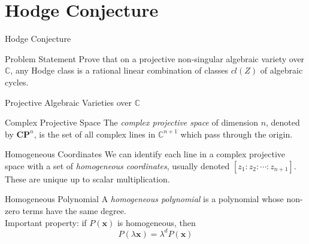 \documentclass{beamer}
\newcommand{\Complex}{\mathbb{C}}
\newcommand{\CP}{\mathbf{CP}}
\renewcommand{\vec}[1]{\mathbf{#1}}
\begin{document}
  \section{Hodge Conjecture}
  \begin{frame}{Hodge Conjecture}
      \begin{block}{Problem Statement}
          Prove that on a projective non-singular algebraic variety over
          $\Complex$, any Hodge class is a rational linear combination of
          classes $cl(Z)$ of algebraic cycles.
      \end{block}
  \end{frame}
  \begin{frame}{Projective Algebraic Varieties over $\Complex$}
      \pause
      \begin{block}{Complex Projective Space}
          The \textit{complex projective space} of dimension $n$, denoted by
          $\CP^n$, is the set of all \alert{complex} lines in $\Complex^{n+1}$
          which pass through the origin.
      \end{block}
      \pause
      \begin{block}{Homogeneous Coordinates}
          We can identify each line in a complex projective space with a set of
          \textit{homogeneous coordinates}, usually denoted $[z_1 : z_2 :
          \cdots : z_{n+1}]$. These are unique up to scalar multiplication.
      \end{block}
      \pause
      \begin{block}{Homogeneous Polynomial}
          A \textit{homogeneous polynomial} is a polynomial whose non-zero
          terms have the same degree.
          \pause\\
          Important property: if $P(\vec{x})$ is homogeneous, then
          $$P(\lambda\vec{x}) = \lambda^d P(\vec{x})$$
      \end{block}
  \end{frame}
\end{document}
